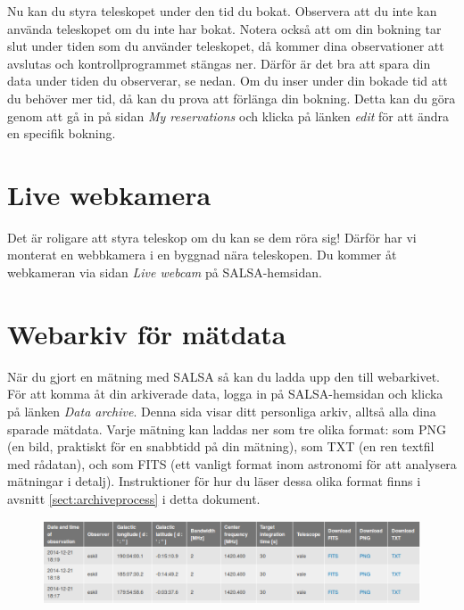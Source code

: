 Nu kan du styra teleskopet under den tid du bokat. Observera att du inte kan
använda teleskopet om du inte har bokat. Notera också att om din bokning tar
slut under tiden som du använder teleskopet, då kommer dina observationer
att avslutas och kontrollprogrammet stängas ner. Därför är det bra att spara 
din data under tiden du observerar, se nedan. Om du inser under din bokade tid
att du behöver mer tid, då kan du prova att förlänga din bokning. Detta kan du göra
genom att gå in på sidan \emph{My reservations} och klicka på länken 
\emph{edit} för att ändra en specifik bokning.

\section{Live webkamera}
Det är roligare att styra teleskop om du kan se dem röra sig! Därför har vi 
monterat en webbkamera i en byggnad nära teleskopen. Du kommer åt webkameran
via sidan \emph{Live webcam} på SALSA-hemsidan.

\section{Webarkiv för mätdata}
\label{sect:archive}
När du gjort en mätning med SALSA så kan du ladda upp den till webarkivet. För
att komma åt din arkiverade data, logga in på SALSA-hemsidan och klicka på länken 
\emph{Data archive}. Denna sida visar ditt personliga arkiv, alltså alla dina 
sparade mätdata. Varje mätning kan laddas ner som tre olika format: som PNG 
(en bild, praktiskt för en snabbtidd på din mätning), som TXT (en ren textfil
med rådatan), och som FITS (ett vanligt format inom astronomi
för att analysera mätningar i detalj). Instruktioner för hur du läser
dessa olika format finns i avsnitt \ref{sect:archiveprocess} i detta dokument.
\begin{figure}[h]
\centering
\includegraphics[width=\textwidth]{../figures/SALSA_archive.png}
\end{figure}
